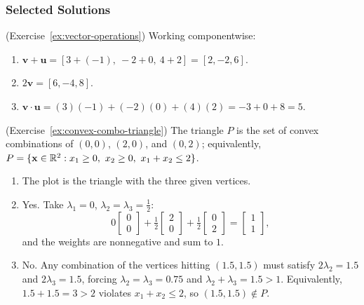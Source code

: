 \subsubsection*{Selected Solutions}

\begin{solution}(Exercise~\ref{ex:vector-operations})
Working componentwise:
\begin{enumerate}
    \item \( \mathbf{v} + \mathbf{u} = [3 + (-1),\ -2 + 0,\ 4 + 2] = [2, -2, 6] \).
    \item \( 2\mathbf{v} = [6, -4, 8] \).
    \item \( \mathbf{v} \cdot \mathbf{u} = (3)(-1) + (-2)(0) + (4)(2) = -3 + 0 + 8 = 5 \).
\end{enumerate}
\end{solution}

\begin{solution}(Exercise~\ref{ex:convex-combo-triangle})
The triangle \( P \) is the set of convex combinations of \( (0,0) \), \( (2,0) \), and \( (0,2) \); equivalently, \( P = \{ \mathbf{x} \in \mathbb{R}^2 : x_1 \geq 0,\ x_2 \geq 0,\ x_1 + x_2 \leq 2 \} \).

\begin{enumerate}
    \item The plot is the triangle with the three given vertices.
    \item Yes.  Take \( \lambda_1 = 0 \), \( \lambda_2 = \lambda_3 = \tfrac12 \):
    \[
    0 \begin{bmatrix} 0 \\ 0 \end{bmatrix} + \tfrac12 \begin{bmatrix} 2 \\ 0 \end{bmatrix} + \tfrac12 \begin{bmatrix} 0 \\ 2 \end{bmatrix} = \begin{bmatrix} 1 \\ 1 \end{bmatrix},
    \]
    and the weights are nonnegative and sum to \( 1 \).
    \item No.  Any combination of the vertices hitting \( (1.5, 1.5) \) must satisfy \( 2\lambda_2 = 1.5 \) and \( 2\lambda_3 = 1.5 \), forcing \( \lambda_2 = \lambda_3 = 0.75 \) and \( \lambda_2 + \lambda_3 = 1.5 > 1 \).  Equivalently, \( 1.5 + 1.5 = 3 > 2 \) violates \( x_1 + x_2 \leq 2 \), so \( (1.5, 1.5) \notin P \).
\end{enumerate}
\end{solution}


